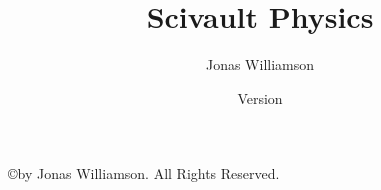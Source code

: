 \documentclass[12pt,openany]{book}
\newcommand{\mytitle}{Scivault Physics}
\begin{document}
	\frontmatter
	\title{\mytitle}
	\author{Jonas Williamson}
	\date{Version \the\year\the\month\the\day}
	\maketitle

\normalsize
	\copyright \space \the\year\space by Jonas Williamson.  All Rights Reserved. 
	
		\vspace{2 in}	


	\vspace{1 in}

	\tableofcontents


\mainmatter


	
	
	
	
	
	

	
	






	


		
		
	









\appendix

\appendixpage
\noappendicestocpagenum
\addappheadtotoc




		
	\backmatter	
	
\printindex		
\end{document}
